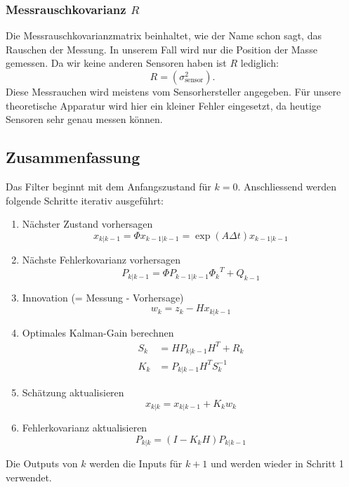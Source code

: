 \subsubsection*{Messrauschkovarianz $R$}
Die Messrauschkovarianzmatrix beinhaltet, wie der Name schon sagt, das Rauschen der Messung. 
In unserem Fall wird nur die Position der Masse gemessen. Da wir keine anderen Sensoren haben ist $R$ lediglich:
\[ 
R= (\sigma_\mathrm{sensor}^2).
 \] 
Diese Messrauchen wird meistens vom Sensorhersteller angegeben. 
Für unsere theoretische Apparatur wird hier ein kleiner Fehler eingesetzt,
da heutige Sensoren sehr genau messen können.

\clearpage
\subsection{Zusammenfassung }
Das Filter beginnt mit dem Anfangszustand für $k=0$.
Anschliessend werden folgende Schritte iterativ ausgeführt:
\begin{enumerate}
\item Nächster Zustand vorhersagen
\[
{x_{k|k-1}}=\Phi{x_{k-1|k-1}}= \exp(A\Delta t){x_{k-1|k-1}}
\] 

 \item Nächste Fehlerkovarianz vorhersagen
\[
{P_{k|k-1}}=\Phi {P_{k-1|k-1}} {\Phi _{k}}^T + {Q_{k-1}}
\] 

\item Innovation (= Messung - Vorhersage)
\[
{w_{k}}={z_{k}}-{H}{x_{k|k-1}}
\] 

\item Optimales Kalman-Gain berechnen
\begin{align*}
{S_{k}} &={H}{P_{k|k-1}}{H}^T+{R_{k}}\\
{K_{k}} &= {P_{k|k-1}} {H^T}{S_{k}^{-1}}
\end{align*}

\item Schätzung aktualisieren
\[
{x_{k|k}}={x_{k|k-1}}+{K_{k}}{w_{k}}
\] 

\item Fehlerkovarianz aktualisieren
\[
{P_{k|k}}=(I-{K_{k}}{H}){P_{k|k-1}}
\] 

\end{enumerate}
Die Outputs von $k$ werden die Inputs für ${k+1}$ und werden wieder in Schritt 1 verwendet.

